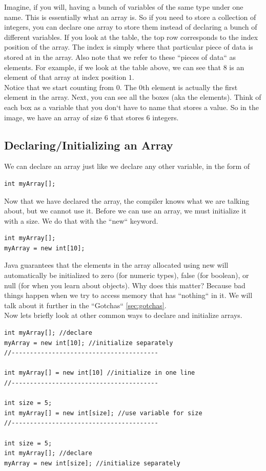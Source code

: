 \documentclass[11]{article}
\begin{document}
Imagine, if you will, having a bunch of variables of the same type under one name. This is essentially what an array is. So if you need to store a collection of integers, you can declare one array to store them instead of declaring a bunch of different variables. If you look at the table, the top row corresponds to the index position of the array. The index is simply where that particular piece of data is stored at in the array. Also note that we refer to these ``pieces of data`` as elements. For example, if we look at the table above, we can see that $8$ is an element of that array at index position $1$. \\

Notice that we start counting from $0$. The $0$th element is actually the first element in the array. Next, you can see all the boxes (aka the elements). Think of each box as a variable that you don`t have to name that stores a value. So in the image, we have an array of size $6$ that stores $6$ integers.\\

\subsection{Declaring/Initializing an Array}
We can declare an array just like we declare any other variable, in the form of
\begin{lstlisting}
int myArray[];
\end{lstlisting}
Now that we have declared the array, the compiler knows what we are talking about, but we cannot use it. Before we can use an array, we must initialize it with a size. We do that with the ``new`` keyword.

\begin{lstlisting}
int myArray[];
myArray = new int[10];
\end{lstlisting}
Java guarantees that the elements in the array allocated using new will automatically be initialized to zero (for numeric types), false (for boolean), or null (for when you learn about objects). Why does this matter? Because bad things happen when we try to access memory that has ``nothing`` in it. We will talk about it further in the ``Gotchas``  \autoref{sec:gotchas}. \\

Now lets briefly look at other common ways to declare and initialize arrays.

\begin{lstlisting}
int myArray[]; //declare
myArray = new int[10]; //initialize separately
//----------------------------------------

int myArray[] = new int[10] //initialize in one line
//----------------------------------------

int size = 5;
int myArray[] = new int[size]; //use variable for size
//----------------------------------------

int size = 5;
int myArray[]; //declare
myArray = new int[size]; //initialize separately
\end{lstlisting}
\end{document}

